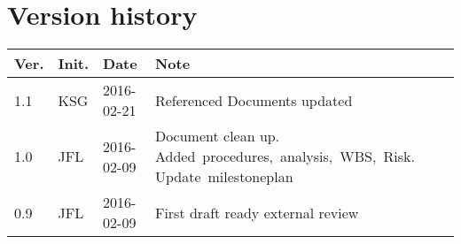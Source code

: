 \chapter*{Version history}
\label{app:rev_his}


\begin{tabular}{b{1cm} b{1cm} b{2cm} b{8cm}}
    \textbf{Ver.} & \textbf{Init.} & \textbf{Date} & \textbf{Note} \\
    \hline
    1.1 & KSG & 2016-02-21 & Referenced Documents updated \\
    1.0 & JFL & 2016-02-09 & Document clean up. Added~procedures,~analysis,~WBS,~Risk. Update~milestoneplan \\
    0.9 & JFL & 2016-02-09 & First draft ready external review \\
\end{tabular}
